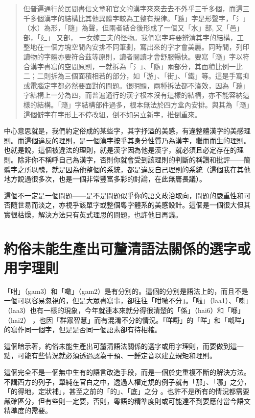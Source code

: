 \documentclass[a5paper, 10pt, openany]{book} %
\begin{document}
\begin{quotation}
  但普遍通行於民間書信文章和官文的漢字來來去去不外乎三千多個，而這三千多個漢字的結構比其他異體字較為工整有規律。「瀡」字是形聲字，「氵」（水）為形，「隨」為聲，但兩者結合後形成了一個又「水」部, 又「邑」部，「廴」 又部， 一女嫁三夫的怪物。我們寫字時要辨清其字的結構，工整地在一個方塊空間內安排不同筆劃，寫出來的字才會美麗。同時間，列印讀物的字體亦要符合茲等原則，讀者閱讀才會舒服暢快。要寫「瀡」字以符合漢字書寫的空間原則，一就拆為「氵」、「隨」兩部分，其面積比例一比二；二則拆為三個面積相若的部分，如「游」、「街」、「鐵」等。這是手寫抑或電腦定字都必然要面對的問題。很明顯，兩種拆法都不湊效，因為「瀡」字結構上一分為四，而普遍通行的漢字根本沒有這樣的結構，亦不能容納這樣的結構。「瀡」字結構部件過多，根本無法於四方盒內安排。與其為「瀡」這個僻字在字形上不停改組，倒不如另立新字，推倒重來。
  
\end{quotation}

中心意思就是，我們約定俗成的某些字，其字抒溢的美感，有違整體漢字的美感理則。而這個違反的理則，是一個漢字按乎其身分性質乃為漢字，繼而而生的理則。也就是說，這個被違法的理則，就是漢字因為他是漢字，就必須且必定存在的理則。除非你不稱呼自己為漢字，否則你就會受到該理則的判斷的稱讚和批評——簡體字之所以醜，就是因為他整個的系統，都是違反自己理則的系統（這個我在其他地方說過很多次，也是一個非常豐富多彩的討論，在此無庸長議）。

這個不一定是一個問題——是不是問題似乎你的語文政治取向，問題的嚴重性和可否隨世易而淡之，亦視乎該單字或整個粵字體系的美感設計。這個是一個很大但其實很枯燥，解決方法只有英式理思的問題，也許他日再議。

\section{約俗未能生產出可釐清語法關係的選字或用字理則}

「咁」（gam3）和「噉」（gam2）是有分別的。這個的分別是語法上的，而且不是一個可以容易忽視的，但是大眾書寫事，卻往往「咁噉不分」。「啦」（laa1）、「喇」（laa3）也有一樣的現象，今年就連本來就分得很清楚的「係」（hai6）和「喺」（hai2）  ，也因「群眾智慧」而有混淆不分的情況。「咩嘢」的「咩」和「嘅咩」的寫作同一個字，但是是否同一個語素卻有待相榷。 

這個暗示著，約俗未能生產出可釐清語法關係的選字或用字理則，而要做到這一點，可能有些情況就必須透過認為干預、一錘定音以建立規矩和理則。

這個完全不是一個無中生有的語言改造手段，而是一個於史重複不斷的解決方法。不講西方的列子，單純在官白之中，透過人權定規的例子就有「那」、「哪」之分，「的得地，定狀補」，甚至之前的「的」、「底」之分 。也許不是所有的情況都需要嚴確區分，但有些則一定要，否則，粵語的精準度則或可能達不到要應付當今語文精準度的需要。
\end{document}
